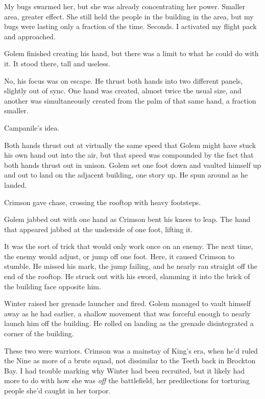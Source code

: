 My bugs swarmed her, but she was already concentrating her power.  Smaller area, greater effect.  She still held the people in the building in the area, but my bugs were lasting only a fraction of the time.  Seconds.  I activated my flight pack and approached.



Golem finished creating his hand, but there was a limit to what he could do with it.  It stood there, tall and useless.



No, his focus was on escape.  He thrust both hands into two different panels, slightly out of sync.  One hand was created, almost twice the usual size, and another was simultaneously created from the palm of that same hand, a fraction smaller.



Campanile's idea.



Both hands thrust out at virtually the same speed that Golem might have stuck his own hand out into the air, but that speed was compounded by the fact that both hands thrust out in unison.  Golem set one foot down and vaulted himself up and out to land on the adjacent building, one story up.  He spun around as he landed.



Crimson gave chase, crossing the rooftop with heavy footsteps.



Golem jabbed out with one hand as Crimson bent his knees to leap.  The hand that appeared jabbed at the underside of one foot, lifting it.



It was the sort of trick that would only work once on an enemy.  The next time, the enemy would adjust, or jump off one foot.  Here, it caused Crimson to stumble.  He missed his mark, the jump failing, and he nearly ran straight off the end of the rooftop.  He struck out with his sword, slamming it into the brick of the building face opposite him.



Winter raised her grenade launcher and fired.  Golem managed to vault himself away as he had earlier, a shallow movement that was forceful enough to nearly launch him off the building.  He rolled on landing as the grenade disintegrated a corner of the building.



These two were warriors.  Crimson was a mainstay of King's era, when he'd ruled the Nine as more of a brute squad, not dissimilar to the Teeth back in Brockton Bay.  I had trouble marking why Winter had been recruited, but it likely had more to do with how she was \emph{off} the battlefield, her predilections for torturing people she'd caught in her torpor.



